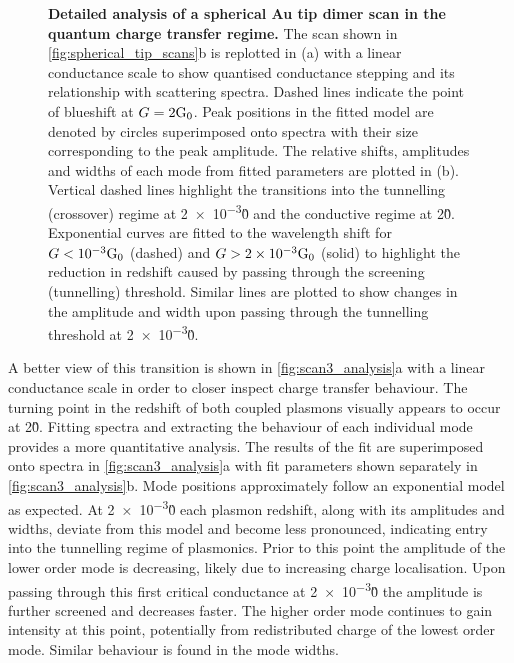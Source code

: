 \documentclass[a4paper, 11pt]{article}
\begin{document}
\begin{figure}[bt]
\caption[Detailed analysis of a spherical Au tip dimer scan in the quantum charge transfer regime]{\textbf{Detailed analysis of a spherical Au tip dimer scan in the quantum charge transfer regime.} The scan shown in \autoref{fig:spherical_tip_scans}b is replotted in (a) with a linear conductance scale to show quantised conductance stepping and its relationship with scattering spectra. Dashed lines indicate the point of blueshift at $G=2\mathrm{G_{0}}$. Peak positions in the fitted model are denoted by circles superimposed onto spectra with their size corresponding to the peak amplitude. The relative shifts, amplitudes and widths of each mode from fitted parameters are plotted in (b). Vertical dashed lines highlight the transitions into the tunnelling (crossover) regime at \num{2e-3}\G0 and the conductive regime at 2\G0. Exponential curves are fitted to the wavelength shift for $G<\num{e-3}\mathrm{G_{0}}$ (dashed) and $G>\num{2e-3}\mathrm{G_{0}}$ (solid) to highlight the reduction in redshift caused by passing through the screening (tunnelling) threshold. Similar lines are plotted to show changes in the amplitude and width upon passing through the tunnelling threshold at \num{2e-3}\G0.}
\label{fig:scan3_analysis}
\vspace{-5pt}
\end{figure}

A better view of this transition is shown in \autoref{fig:scan3_analysis}a with a linear conductance scale in order to closer inspect charge transfer behaviour. The turning point in the redshift of both coupled plasmons visually appears to occur at 2\G0. Fitting spectra and extracting the behaviour of each individual mode provides a more quantitative analysis. The results of the fit are superimposed onto spectra in \autoref{fig:scan3_analysis}a with fit parameters shown separately in \autoref{fig:scan3_analysis}b. Mode positions approximately follow an exponential model as expected. At \num{2e-3}\G0 each plasmon redshift, along with its amplitudes and widths, deviate from this model and become less pronounced, indicating entry into the tunnelling regime of plasmonics. Prior to this point the amplitude of the lower order mode is decreasing, likely due to increasing charge localisation. Upon passing through this first critical conductance at \num{2e-3}\G0 the amplitude is further screened and decreases faster. The higher order mode continues to gain intensity at this point, potentially from redistributed charge of the lowest order mode. Similar behaviour is found in the mode widths.
\end{document}
